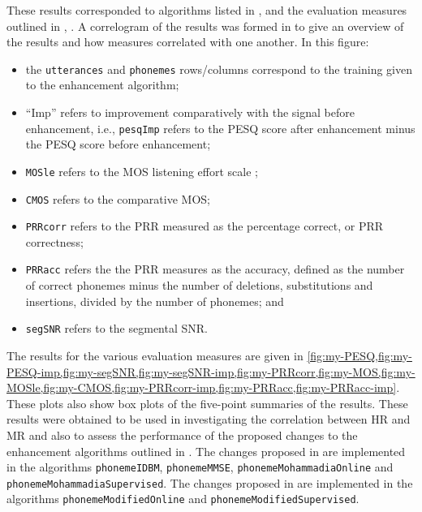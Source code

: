 These results corresponded to algorithms listed in ,
\textit{} and the evaluation measures outlined
in , \textit{}.
A correlogram of the results was formed in  to give
an overview of the results and how measures correlated with one another.
In this figure:
\begin{itemize}
\item the \lstinline!utterances! and \lstinline!phonemes! rows/columns
correspond to the training given to the enhancement algorithm;
\item ``Imp'' refers to improvement comparatively with the signal before
enhancement, i.e., \lstinline!pesqImp! refers to the \ac{PESQ} score
after enhancement minus the \ac{PESQ} score before enhancement;
\item \lstinline!MOSle! refers to the \ac{MOS} listening effort scale
\citep{InternationalTelecommunicationUnion1996};
\item \lstinline!CMOS! refers to the comparative \ac{MOS};
\item \lstinline!PRRcorr! refers to the \ac{PRR} measured as the percentage
correct, or \ac{PRR} correctness;
\item \lstinline!PRRacc! refers the the \ac{PRR} measures as the accuracy,
defined as the number of correct phonemes minus the number of deletions,
substitutions and insertions, divided by the number of phonemes; and
\item \lstinline!segSNR! refers to the segmental \ac{SNR}.
\end{itemize}
The results for the various evaluation measures are given in \cref{fig:my-PESQ,fig:my-PESQ-imp,fig:my-segSNR,fig:my-segSNR-imp,fig:my-PRRcorr,fig:my-MOS,fig:my-MOSle,fig:my-CMOS,fig:my-PRRcorr-imp,fig:my-PRRacc,fig:my-PRRacc-imp}.
These plots also show box plots of the five-point summaries of the
results. These results were obtained to be used in investigating the
correlation between \ac{HR} and \ac{MR} and also to assess the performance
of the proposed changes to the enhancement algorithms outlined in
. The changes proposed in 
are implemented in the algorithms \lstinline[breaklines=true]!phonemeIDBM!,
\lstinline[breaklines=true]!phonemeMMSE!, \lstinline[breaklines=true]!phonemeMohammadiaOnline!
and \lstinline[breaklines=true]!phonemeMohammadiaSupervised!. The
changes proposed in  are implemented in the
algorithms \lstinline[breaklines=true]!phonemeModifiedOnline! and\linebreak{}
\lstinline[breaklines=true]!phonemeModifiedSupervised!.


